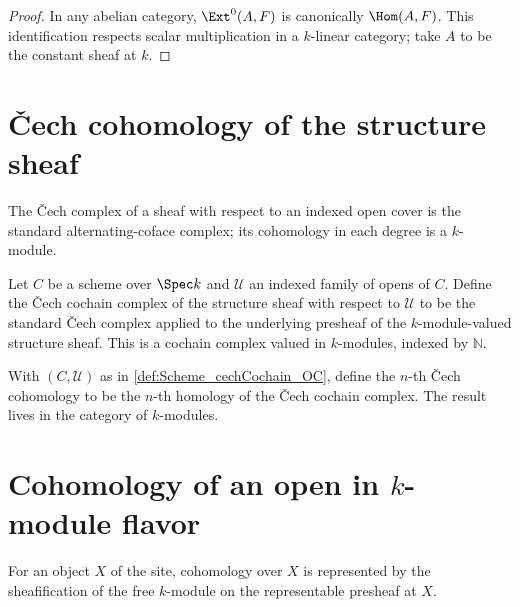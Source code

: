 \begin{proof}

  \leanok
  In any abelian category, \(\Ext^0(A,F)\) is canonically \(\Hom(A,F)\). This identification respects scalar multiplication in a \(k\)-linear category; take \(A\) to be the constant sheaf at \(k\).
\end{proof}

\section{\v{C}ech cohomology of the structure sheaf}
\label{sec:moduleK_cech}

The \v{C}ech complex of a sheaf with respect to an indexed open cover is the standard alternating-coface complex; its cohomology in each degree is a \(k\)-module.

\begin{definition}\leanok
  \label{def:Scheme_cechCochain_OC}
  Let \(C\) be a scheme over \(\Spec k\) and \(\mathcal U\) an indexed family of opens of \(C\). Define the \v{C}ech cochain complex of the structure sheaf with respect to \(\mathcal U\) to be the standard \v{C}ech complex applied to the underlying presheaf of the \(k\)-module-valued structure sheaf. This is a cochain complex valued in \(k\)-modules, indexed by \(\mathbb N\).
\end{definition}

\begin{definition}\leanok
  \label{def:Scheme_cechCohomology_OC}
  With \((C, \mathcal U)\) as in \cref{def:Scheme_cechCochain_OC}, define the \(n\)-th \v{C}ech cohomology to be the \(n\)-th homology of the \v{C}ech cochain complex. The result lives in the category of \(k\)-modules.
\end{definition}

\section{Cohomology of an open in \(k\)-module flavor}
\label{sec:hmodule_prime}

For an object \(X\) of the site, cohomology over \(X\) is represented by the sheafification of the free \(k\)-module on the representable presheaf at \(X\).

